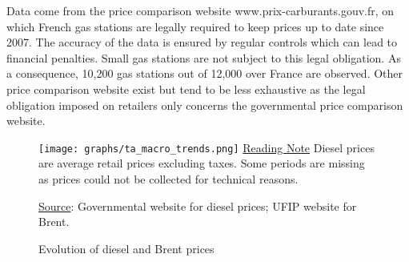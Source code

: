 \documentclass[english]{article}
\begin{document}
Data come from the price comparison website www.prix-carburants.gouv.fr, on which French gas stations are legally required to keep prices up to date since 2007. The accuracy of the data is ensured by regular controls which can lead to financial penalties. Small gas stations are not subject to this legal obligation. As a consequence, 10,200 gas stations out of 12,000 over France are observed. Other price comparison website exist but tend to be less exhaustive as the legal obligation imposed on retailers only concerns the governmental price comparison website. 

\begin{figure}[htb!]
    \caption{Evolution of diesel and Brent prices}
		\label{fig:diesel_and_brent}
\texttt{[image: graphs/ta\_macro\_trends.png]}
\flushleft
{\footnotesize\uline{Reading Note}
Diesel prices are average retail prices excluding taxes. Some periods are missing as prices could not be collected for technical reasons.}{\footnotesize \par}
{\footnotesize\uline{Source}: Governmental website for diesel prices; UFIP website for Brent.}
\end{figure}
\end{document}
